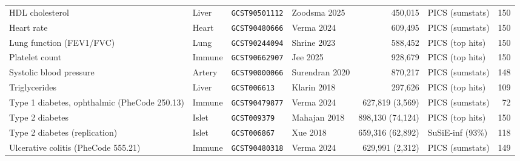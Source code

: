 \begin{longtable}{>{\raggedright\arraybackslash}p{3.4cm}>{\raggedright\arraybackslash}p{1.4cm}>{\raggedright\arraybackslash}p{2.5cm}>{\raggedright\arraybackslash}p{1.9cm}r>{\raggedright\arraybackslash}p{2.0cm}r}
HDL cholesterol & Liver & \texttt{GCST90501112} & Zoodsma 2025 & 450,015 & PICS (sumstats) & 150 \\
Heart rate & Heart & \texttt{GCST90480666} & Verma 2024 & 609,495 & PICS (sumstats) & 150 \\
Lung function (FEV1/FVC) & Lung & \texttt{GCST90244094} & Shrine 2023 & 588,452 & PICS (top hits) & 150 \\
Platelet count & Immune & \texttt{GCST90662907} & Jee 2025 & 928,679 & PICS (top hits) & 150 \\
Systolic blood pressure & Artery & \texttt{GCST90000066} & Surendran 2020 & 870,217 & PICS (sumstats) & 148 \\
Triglycerides & Liver & \texttt{GCST006613} & Klarin 2018 & 297,626 & PICS (top hits) & 109 \\
Type 1 diabetes, ophthalmic (PheCode 250.13) & Immune & \texttt{GCST90479877} & Verma 2024 & 627,819 (3,569) & PICS (sumstats) & 72 \\
Type 2 diabetes & Islet & \texttt{GCST009379} & Mahajan 2018 & 898,130 (74,124) & PICS (top hits) & 150 \\
Type 2 diabetes (replication) & Islet & \texttt{GCST006867} & Xue 2018 & 659,316 (62,892) & SuSiE-inf (93\%) & 118 \\
Ulcerative colitis (PheCode 555.21) & Immune & \texttt{GCST90480318} & Verma 2024 & 629,991 (2,312) & PICS (sumstats) & 149 \\
\bottomrule\end{longtable}\endgroup
